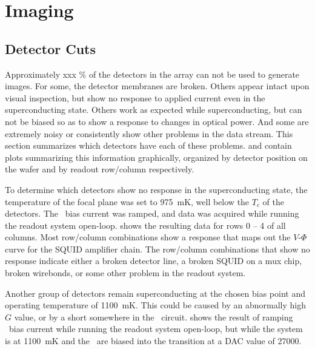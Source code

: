 \chapter{Imaging}\label{c:imaging}

\section{Detector Cuts} \label{sec:ch8-det-cuts}

Approximately xxx \% of the detectors in the array can not be used to generate images.
For some, the detector membranes are broken.
Others appear intact upon visual inspection, but show no response to applied current even in the superconducting state.
Others work as expected while superconducting, but can not be biased so as to show a response to changes in optical power. 
And some are extremely noisy or consistently show other problems in the data stream.
This section summarizes which detectors have each of these problems.
 and  contain plots summarizing this information graphically, organized by detector position on the wafer and by readout row/column respectively.

To determine which detectors show no response in the superconducting state, the temperature of the focal plane was set to 975~mK, well below the $T_c$ of the detectors.
The \TES\ bias current was ramped, and data was acquired while running the readout system open-loop.
 shows the resulting data for rows 0 -- 4 of all columns.
Most row/column combinations show a response that maps out the $V$-$\Phi$ curve for the SQUID amplifier chain.
The row/column combinations that show no response indicate either a broken detector line, a broken SQUID on a mux chip, broken wirebonds, or some other problem in the readout system.

Another group of detectors remain superconducting at the chosen bias point and operating temperature of 1100~mK.
This could be caused by an abnormally high $G$ value, or by a short somewhere in the \TES\ circuit.
 shows the result of ramping \TES\ bias current while running the readout system open-loop, but while the system is at 1100~mK and the \TESs\ are biased into the transition at a DAC value of 27000.

